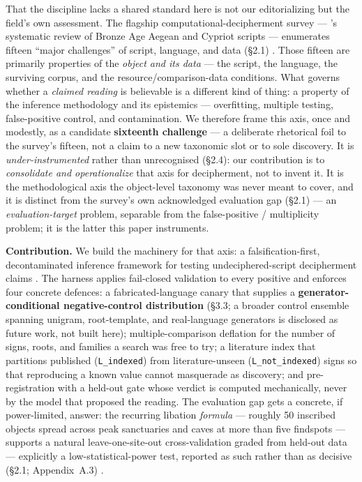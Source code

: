 That the discipline lacks a shared standard here is not our editorializing
but the field's own assessment. The flagship computational-decipherment
survey --- \citeauthor{braovic2024}'s \citeyearpar{braovic2024}
systematic review of Bronze Age Aegean and Cypriot scripts ---
enumerates fifteen ``major challenges'' of script, language, and data
(\S2.1) \citep{braovic2024}. Those fifteen are
primarily properties of the \emph{object and its data} --- the script,
the language, the surviving corpus, and the resource/comparison-data
conditions. What
governs whether a \emph{claimed reading} is believable is a different
kind of thing: a property of the inference methodology and its
epistemics --- overfitting, multiple testing, false-positive control,
and contamination. We therefore frame this axis, once and modestly, as a
candidate \textbf{sixteenth challenge} --- a deliberate rhetorical foil
to the survey's fifteen, not a claim to a new taxonomic slot or to sole
discovery. It is \emph{under-instrumented} rather than unrecognised
(\S2.4): our contribution is to
\emph{consolidate and operationalize} that axis for decipherment, not to
invent it. It is the methodological axis the object-level taxonomy was
never meant to cover, and it is distinct from the survey's own
acknowledged evaluation gap (\S2.1) --- an \emph{evaluation-target}
problem, separable from the false-positive /
multiplicity problem; it is the latter this paper instruments.

\textbf{Contribution.} We build the machinery for that axis: a
falsification-first, decontaminated inference framework for testing
undeciphered-script decipherment claims \citep{braovic2024}. The harness
applies fail-closed validation to every positive and enforces four
concrete defences: a fabricated-language canary that supplies a
\textbf{generator-conditional negative-control distribution} (\S3.3;
a broader control ensemble spanning unigram, root-template, and
real-language generators is disclosed as future work, not built here);
multiple-comparison deflation
for the number of signs, roots, and families a search was free to try; a
literature index that partitions published (\texttt{L\_indexed}) from
literature-unseen (\texttt{L\_not\_indexed}) signs so that reproducing a
known value cannot masquerade as discovery; and pre-registration with a
held-out gate whose verdict is computed mechanically, never by the model
that proposed the reading. The evaluation gap gets a concrete, if
power-limited, answer: the recurring libation \emph{formula} --- roughly
50 inscribed objects spread across peak sanctuaries and caves at more
than five findspots --- supports a natural leave-one-site-out
cross-validation graded from held-out data --- explicitly a
low-statistical-power test, reported as such rather than as decisive
(\S2.1; Appendix~A.3) \citep{braovic2024}.

